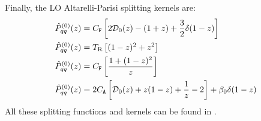 Finally, the LO Altarelli-Parisi splitting kernels are:
\begin{align}
  \hat{P}^{(0)}_{qq}(z) & = C_\mathtt{F} \left[ 2 \mathcal{D}_0(z) - (1 + z) + \frac{3}{2} \delta(1 - z) \right] \\
  \hat{P}^{(0)}_{qq}(z) & = T_\text{R} \left[ (1 - z)^2 + z^2 \right] \\
  \hat{P}^{(0)}_{qq}(z) & = C_\mathtt{F} \left[ \frac{1 + (1 - z)^2}{z} \right] \\
  \hat{P}^{(0)}_{qq}(z) & = 2 C_\mathtt{A} \left[ \mathcal{D}_0(z) + z (1 - z) + \frac{1}{z} - 2 \right] + \beta_0 \delta(1 - z)
\end{align}
All these splitting functions and kernels can be found in \cite{Ellis-1996}.










